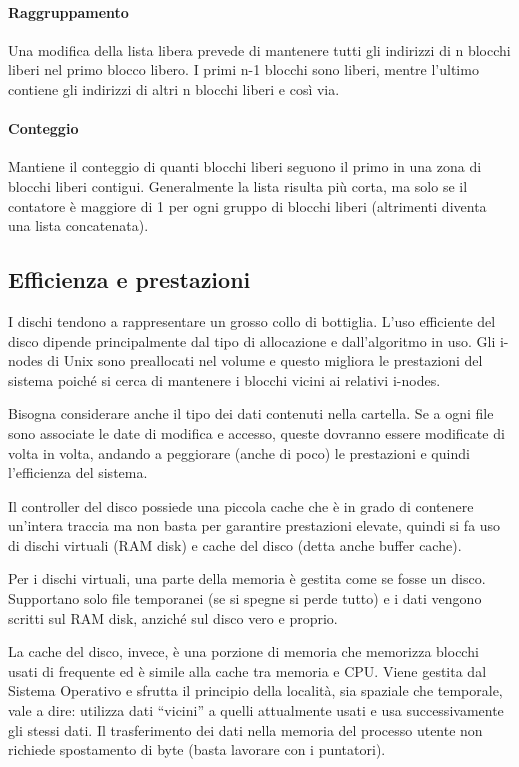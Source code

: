 \documentclass[a4]{article}
\begin{document}
\paragraph{Raggruppamento}
Una modifica della lista libera prevede di mantenere tutti gli indirizzi di n blocchi liberi nel primo blocco libero. I primi n-1 blocchi sono liberi, mentre l'ultimo contiene gli indirizzi di altri n blocchi liberi e così via.

\paragraph{Conteggio}
Mantiene il conteggio di quanti blocchi liberi seguono il primo in una zona di blocchi liberi contigui. Generalmente la lista risulta più corta, ma solo se il contatore è maggiore di 1 per ogni gruppo di blocchi liberi (altrimenti diventa una lista concatenata).

\subsection{Efficienza e prestazioni}
I dischi tendono a rappresentare un grosso collo di bottiglia. L'uso efficiente del disco dipende principalmente dal tipo di allocazione e dall'algoritmo in uso. Gli i-nodes di Unix sono preallocati nel volume e questo migliora le prestazioni del sistema poiché si cerca di mantenere i blocchi vicini ai relativi i-nodes.

Bisogna considerare anche il tipo dei dati contenuti nella cartella. Se a ogni file sono associate le date di modifica e accesso, queste dovranno essere modificate di volta in volta, andando a peggiorare (anche di poco) le prestazioni e quindi l'efficienza del sistema.

Il controller del disco possiede una piccola cache che è in grado di contenere un'intera traccia ma non basta per garantire prestazioni elevate, quindi si fa uso di dischi virtuali (RAM disk) e cache del disco (detta anche buffer cache).

Per i dischi virtuali, una parte della memoria è gestita come se fosse un disco. Supportano solo file temporanei (se si spegne si perde tutto) e i dati vengono scritti sul RAM disk, anziché sul disco vero e proprio.

La cache del disco, invece, è una porzione di memoria che memorizza blocchi usati di frequente ed è simile alla cache tra memoria e CPU. Viene gestita dal Sistema Operativo e sfrutta il principio della località, sia spaziale che temporale, vale a dire: utilizza dati ``vicini'' a quelli attualmente usati e usa successivamente gli stessi dati. \newline
Il trasferimento dei dati nella memoria del processo utente non richiede spostamento di byte (basta lavorare con i puntatori).
\end{document}
